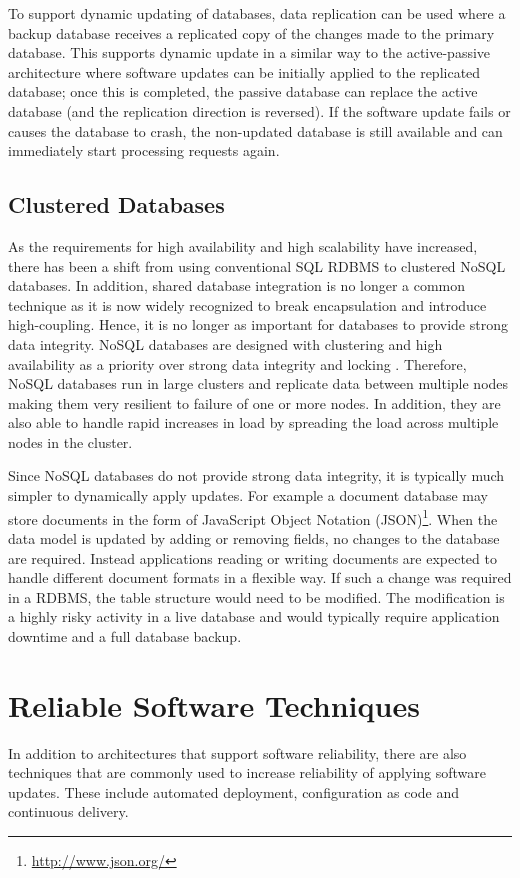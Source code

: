 \documentclass[a4paper,11pt,twoside]{report}
\begin{document}
To support dynamic updating of databases, data replication can be used where a backup database receives a replicated copy of the changes made to the primary database. This supports dynamic update in a similar way to the active-passive architecture where software updates can be initially applied to the replicated database; once this is completed, the passive database can replace the active database (and the replication direction is reversed). If the software update fails or causes the database to crash, the non-updated database is still available and can immediately start processing requests again.

\subsection{Clustered Databases}
As the requirements for high availability and high scalability have increased, there has been a shift from using conventional SQL RDBMS to clustered NoSQL databases. In addition, shared database integration is no longer a common technique as it is now widely recognized to break encapsulation and introduce high-coupling. Hence, it is no longer as important for databases to provide strong data integrity. NoSQL databases are designed with clustering and high availability as a priority over strong data integrity and locking \cite{NoSQL}. Therefore, NoSQL databases run in large clusters and replicate data between multiple nodes making them very resilient to failure of one or more nodes. In addition, they are also able to handle rapid increases in load by spreading the load across multiple nodes in the cluster. 

Since NoSQL databases do not provide strong data integrity, it is typically much simpler to dynamically apply updates. For example a document database may store documents in the form of JavaScript Object Notation (JSON)\footnote{\url{http://www.json.org/}}. When the data model is updated by adding or removing fields, no changes to the database are required. Instead applications reading or writing documents are expected to handle different document formats in a flexible way. If such a change was required in a RDBMS, the table structure would need to be modified. The modification is a highly risky activity in a live database and would typically require application downtime and a full database backup.

\section{Reliable Software Techniques}
In addition to architectures that support software reliability, there are also techniques that are commonly used to increase reliability of applying software updates. These include automated deployment, configuration as code and continuous delivery.
\end{document}
